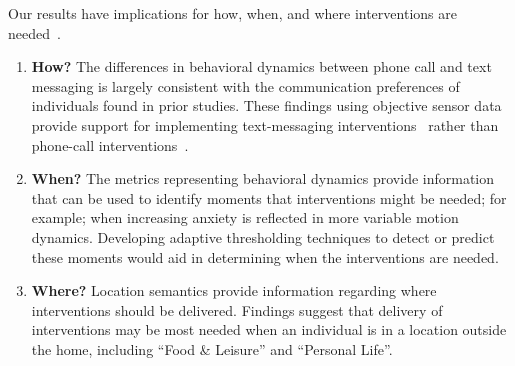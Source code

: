 Our results have implications for how, when, and where interventions are needed~\cite{ng2015annual}.

\begin{enumerate}
\item \textbf{How?}
The differences in behavioral dynamics between phone call and text messaging is largely consistent with the communication preferences of individuals found in prior studies. 
These findings using objective sensor data provide  support for implementing text-messaging interventions~\cite{Anstiss2015reach,owens2016implementation} rather than phone-call interventions~\cite{lundy2016social}. 
% 
% 
% 
% 
% 

\item \textbf{When?}
The metrics representing behavioral dynamics provide information that can be used to identify  moments that interventions might be needed; for example; when increasing anxiety is reflected in more variable motion dynamics. Developing adaptive thresholding techniques to detect or predict these moments would aid in determining when the interventions are needed.  

\item \textbf{Where?}
Location semantics provide information regarding where interventions should be delivered. Findings suggest that delivery of interventions may be most needed when an individual is in a location outside the home, including ``Food \& Leisure'' and ``Personal Life''. 
\end{enumerate}
